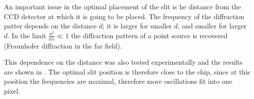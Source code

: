 An important issue in the optimal placement of the slit is he distance from the CCD detector at which it is going to be placed. The frequency of the diffraction patter depends on the distance $d$; it is larger for smaller $d$, and smaller for larger $d$. In the limit $\frac{a^2}{d\lambda} \ll 1$ the diffraction pattern of a point source is recovered (Fraunhofer diffraction in the far field).

This dependence on the distance was also tested experimentally and the results are shown in .
The optimal slit position is therefore close to the chip, since at this position the frequencies are maximal, therefore more oscillations fit into one pixel.

